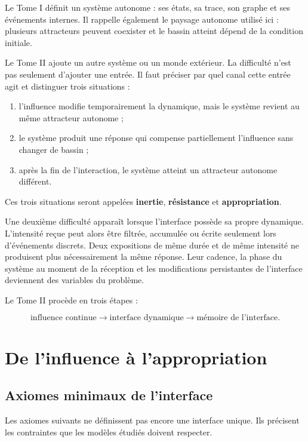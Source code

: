 Le Tome I définit un système autonome : ses états, sa trace, son graphe et ses événements internes. Il rappelle également le paysage autonome utilisé ici : plusieurs attracteurs peuvent coexister et le bassin atteint dépend de la condition initiale.

Le Tome II ajoute un autre système ou un monde extérieur. La difficulté n'est pas seulement d'ajouter une entrée. Il faut préciser par quel canal cette entrée agit et distinguer trois situations :

\begin{enumerate}
\def\labelenumi{\arabic{enumi}.}
\tightlist
\item
  l'influence modifie temporairement la dynamique, mais le système revient au même attracteur autonome ;
\item
  le système produit une réponse qui compense partiellement l'influence sans changer de bassin ;
\item
  après la fin de l'interaction, le système atteint un attracteur autonome différent.
\end{enumerate}

Ces trois situations seront appelées \textbf{inertie},
\textbf{résistance} et \textbf{appropriation}.

Une deuxième difficulté apparaît lorsque l'interface possède sa propre dynamique. L'intensité reçue peut alors être filtrée, accumulée ou écrite seulement lors d'événements discrets. Deux expositions de même durée et de même intensité ne produisent plus nécessairement la même réponse. Leur cadence, la phase du système au moment de la réception et les modifications persistantes de l'interface deviennent des variables du problème.

Le Tome II procède en trois étapes :

\[
\text{influence continue}
\longrightarrow
\text{interface dynamique}
\longrightarrow
\text{mémoire de l'interface}.
\]

\part{De l’influence à l’appropriation}
\chapter{Axiomes minimaux de l'interface}\label{t2-axiomes-minimaux-de-linterface}

Les axiomes suivants ne définissent pas encore une interface unique. Ils
précisent les contraintes que les modèles étudiés doivent respecter.

